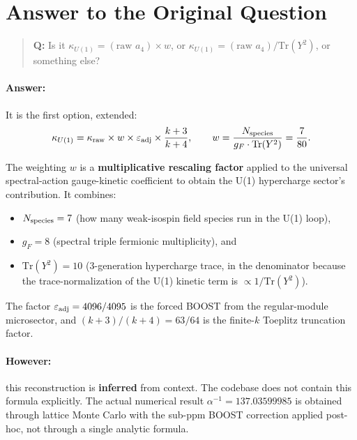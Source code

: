 \documentclass[11pt]{article}
\begin{document}
\section{Answer to the Original Question}

\begin{quote}
\textbf{Q:} Is it $\kappa_{U(1)} = (\text{raw } a_4) \times w$, or
$\kappa_{U(1)} = (\text{raw } a_4) / \mathrm{Tr}(Y^2)$, or something else?
\end{quote}

\paragraph{Answer:} It is the first option, extended:
\begin{equation}
\kappa_{U(1)} = \kappa_{\rm raw} \times w \times \varepsilon_{\rm adj}
\times \frac{k+3}{k+4},
\qquad w = \frac{N_{\rm species}}{g_F \cdot \mathrm{Tr}(Y^2)} = \frac{7}{80}.
\end{equation}

The weighting $w$ is a \textbf{multiplicative rescaling factor} applied to the
universal spectral-action gauge-kinetic coefficient to obtain the U(1)
hypercharge sector's contribution.  It combines:
\begin{itemize}
\item $N_{\rm species} = 7$ (how many weak-isospin field species run in
      the U(1) loop),
\item $g_F = 8$ (spectral triple fermionic multiplicity), and
\item $\mathrm{Tr}(Y^2) = 10$ (3-generation hypercharge trace, in the
      denominator because the trace-normalization of the U(1) kinetic
      term is $\propto 1/\mathrm{Tr}(Y^2)$).
\end{itemize}

The factor $\varepsilon_{\rm adj} = 4096/4095$ is the forced BOOST from the
regular-module microsector, and $(k+3)/(k+4) = 63/64$ is the finite-$k$
Toeplitz truncation factor.

\paragraph{However:} this reconstruction is \textbf{inferred} from context.
The codebase does not contain this formula explicitly.  The actual numerical
result $\alpha^{-1} = 137.03599985$ is obtained through lattice Monte Carlo
with the sub-ppm BOOST correction applied post-hoc, not through a single
analytic formula.
\end{document}

